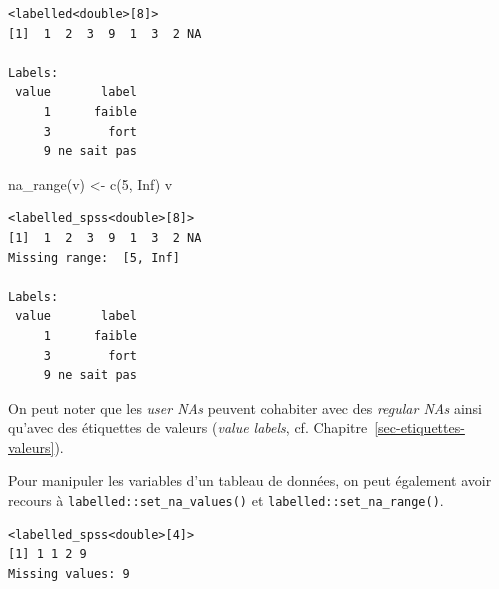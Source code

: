\documentclass[
  letterpaper,
  DIV=11,
  numbers=noendperiod,
  oneside]{scrreprt}
\newenvironment{Shaded}{\begin{snugshade}}{\end{snugshade}}
\newcommand{\AttributeTok}[1]{\textcolor[rgb]{0.40,0.45,0.13}{#1}}
\newcommand{\ConstantTok}[1]{\textcolor[rgb]{0.56,0.35,0.01}{#1}}
\newcommand{\DecValTok}[1]{\textcolor[rgb]{0.68,0.00,0.00}{#1}}
\newcommand{\FunctionTok}[1]{\textcolor[rgb]{0.28,0.35,0.67}{#1}}
\newcommand{\NormalTok}[1]{\textcolor[rgb]{0.00,0.23,0.31}{#1}}
\newcommand{\OtherTok}[1]{\textcolor[rgb]{0.00,0.23,0.31}{#1}}
\newcommand{\SpecialCharTok}[1]{\textcolor[rgb]{0.37,0.37,0.37}{#1}}
\newcommand{\StringTok}[1]{\textcolor[rgb]{0.13,0.47,0.30}{#1}}
\begin{document}
\begin{verbatim}
<labelled<double>[8]>
[1]  1  2  3  9  1  3  2 NA

Labels:
 value       label
     1      faible
     3        fort
     9 ne sait pas
\end{verbatim}

\begin{Shaded}
\begin{Highlighting}[]
\FunctionTok{na\_range}\NormalTok{(v) }\OtherTok{\textless{}{-}} \FunctionTok{c}\NormalTok{(}\DecValTok{5}\NormalTok{, }\ConstantTok{Inf}\NormalTok{)}
\NormalTok{v}
\end{Highlighting}
\end{Shaded}

\begin{verbatim}
<labelled_spss<double>[8]>
[1]  1  2  3  9  1  3  2 NA
Missing range:  [5, Inf]

Labels:
 value       label
     1      faible
     3        fort
     9 ne sait pas
\end{verbatim}

On peut noter que les \emph{user NAs} peuvent cohabiter avec des
\emph{regular NAs} ainsi qu'avec des étiquettes de valeurs (\emph{value
labels}, cf. Chapitre~\ref{sec-etiquettes-valeurs}).

Pour manipuler les variables d'un tableau de données, on peut également
avoir recours à \texttt{labelled::set\_na\_values()} et
\texttt{labelled::set\_na\_range()}.

\begin{Shaded}
\end{Shaded}

\begin{verbatim}
<labelled_spss<double>[4]>
[1] 1 1 2 9
Missing values: 9
\end{verbatim}
\end{document}
